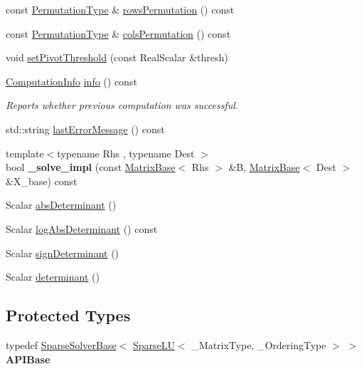 \begin{DoxyCompactItemize}
\item 
const \mbox{\hyperlink{class_eigen_1_1_permutation_matrix}{Permutation\+Type}} \& \mbox{\hyperlink{class_eigen_1_1_sparse_l_u_a691295e65c06df599876d78ac2c7fada}{rows\+Permutation}} () const
\item 
const \mbox{\hyperlink{class_eigen_1_1_permutation_matrix}{Permutation\+Type}} \& \mbox{\hyperlink{class_eigen_1_1_sparse_l_u_ab7b0d15d0d9fd1faa164298f92ca59cd}{cols\+Permutation}} () const
\item 
void \mbox{\hyperlink{class_eigen_1_1_sparse_l_u_a94c726c9ebb71a60b529fe47d942ad57}{set\+Pivot\+Threshold}} (const Real\+Scalar \&thresh)
\item 
\mbox{\hyperlink{group__enums_ga85fad7b87587764e5cf6b513a9e0ee5e}{Computation\+Info}} \mbox{\hyperlink{class_eigen_1_1_sparse_l_u_ab0d0c1744ffd5a1dff578a44bcef2a3d}{info}} () const
\begin{DoxyCompactList}\small\item\em Reports whether previous computation was successful. \end{DoxyCompactList}\item 
std\+::string \mbox{\hyperlink{class_eigen_1_1_sparse_l_u_a5458c4e851d7d75c8ca92c4fd02d2adb}{last\+Error\+Message}} () const
\item 
\mbox{\label{class_eigen_1_1_sparse_l_u_aca57d33f0acf9d0d4fcf85c715b73cc6}} 
{\footnotesize template$<$typename Rhs , typename Dest $>$ }\\bool {\bfseries \+\_\+solve\+\_\+impl} (const \mbox{\hyperlink{class_eigen_1_1_matrix_base}{Matrix\+Base}}$<$ Rhs $>$ \&B, \mbox{\hyperlink{class_eigen_1_1_matrix_base}{Matrix\+Base}}$<$ Dest $>$ \&X\+\_\+base) const
\item 
Scalar \mbox{\hyperlink{class_eigen_1_1_sparse_l_u_a06fa89424239fb169d408f08252426d0}{abs\+Determinant}} ()
\item 
Scalar \mbox{\hyperlink{class_eigen_1_1_sparse_l_u_a89e30a7df205596784a5a73f4768eaec}{log\+Abs\+Determinant}} () const
\item 
Scalar \mbox{\hyperlink{class_eigen_1_1_sparse_l_u_a6651143e3b18fa90cfb3808b6fd23c4e}{sign\+Determinant}} ()
\item 
Scalar \mbox{\hyperlink{class_eigen_1_1_sparse_l_u_a02d63d242d27211b5c5827f5d4fd99ff}{determinant}} ()
\end{DoxyCompactItemize}
\subsection*{Protected Types}
\begin{DoxyCompactItemize}
\item 
\mbox{\label{class_eigen_1_1_sparse_l_u_a9c28d06780ee2dbddcdab9861ec63c22}} 
typedef \mbox{\hyperlink{class_eigen_1_1_sparse_solver_base}{Sparse\+Solver\+Base}}$<$ \mbox{\hyperlink{class_eigen_1_1_sparse_l_u}{Sparse\+LU}}$<$ \+\_\+\+Matrix\+Type, \+\_\+\+Ordering\+Type $>$ $>$ {\bfseries A\+P\+I\+Base}
\end{DoxyCompactItemize}
